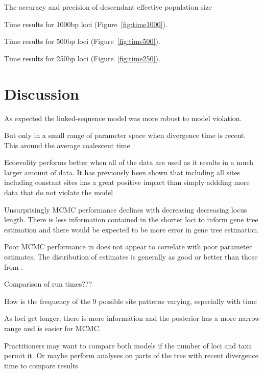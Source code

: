 The accuracy and precision of descendant effective population size











Time results for 1000bp loci (Figure~\ref{fig:time1000}).

Time results for 500bp loci (Figure~\ref{fig:time500}).

Time results for 250bp loci (Figure~\ref{fig:time250}).

\section{Discussion}

As expected the linked-sequence model was more robust to model violation.

But only in a small range of parameter space when divergence time is recent. This
around the average coalescent time

Ecoevolity performs better when all of the data are used as it results in a much larger 
amount of data. It has previously been shown that including all sites including 
constant sites has a great positive impact than simply addding more data that 
do not violate the model \citep{Oaks2018ecoevolity}

Unsurprisingly MCMC performance declines with decreasing decreasing locus length.
There is less information contained in the shorter loci to inform gene tree estimation 
and there would be expected to be more error in gene tree estimation.

Poor MCMC performance in \beast does not appear to correlate with poor parameter 
estimates. The distribution of estimates is generally as good or better than those 
from \ecoevolity. 

Comparison of run times???

How is the frequency of the 9 possible site patterns varying, especially with time

As loci get longer, there is more information and the posterior has a more 
narrow range and is easier for MCMC.

Practitioners may want to compare both models if the number of loci and taxa
permit it. Or maybe perform analyses on parts of the tree with recent divergence
time to compare results 
